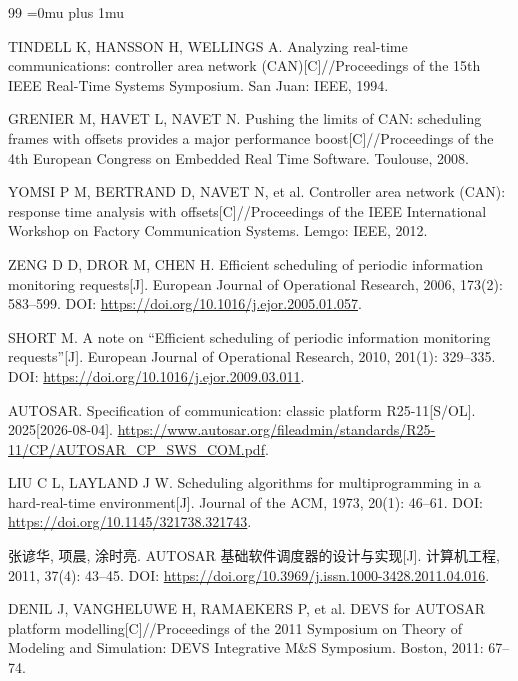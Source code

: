 \documentclass[UTF8,a4paper,twoside,zihao=-4]{ctexart}
\numberwithin{equation}{section}
\numberwithin{figure}{section}
\numberwithin{table}{section}
\theoremstyle{definition}
\numberwithin{algocf}{section}
\begin{document}
\clearpage
{}
{}
\begin{thebibliography}{99}
\songti\RaggedRight
\Urlmuskip=0mu plus 1mu\relax
\setlength{\itemsep}{0pt}
\setlength{\parsep}{0pt}

TINDELL K, HANSSON H, WELLINGS A. Analyzing real-time communications: controller area network (CAN)[C]//Proceedings of the 15th IEEE Real-Time Systems Symposium. San Juan: IEEE, 1994.

GRENIER M, HAVET L, NAVET N. Pushing the limits of CAN: scheduling frames with offsets provides a major performance boost[C]//Proceedings of the 4th European Congress on Embedded Real Time Software. Toulouse, 2008.

YOMSI P M, BERTRAND D, NAVET N, et al. Controller area network (CAN): response time analysis with offsets[C]//Proceedings of the IEEE International Workshop on Factory Communication Systems. Lemgo: IEEE, 2012.

ZENG D D, DROR M, CHEN H. Efficient scheduling of periodic information monitoring requests[J]. European Journal of Operational Research, 2006, 173(2): 583--599. DOI: \url{https://doi.org/10.1016/j.ejor.2005.01.057}.

SHORT M. A note on ``Efficient scheduling of periodic information monitoring requests''[J]. European Journal of Operational Research, 2010, 201(1): 329--335. DOI: \url{https://doi.org/10.1016/j.ejor.2009.03.011}.

AUTOSAR. Specification of communication: classic platform R25-11[S/OL]. 2025[2026-08-04]. \url{https://www.autosar.org/fileadmin/standards/R25-11/CP/AUTOSAR_CP_SWS_COM.pdf}.

LIU C L, LAYLAND J W. Scheduling algorithms for multiprogramming in a hard-real-time environment[J]. Journal of the ACM, 1973, 20(1): 46--61. DOI: \url{https://doi.org/10.1145/321738.321743}.

张谚华, 项晨, 涂时亮. AUTOSAR 基础软件调度器的设计与实现[J]. 计算机工程, 2011, 37(4): 43--45. DOI: \url{https://doi.org/10.3969/j.issn.1000-3428.2011.04.016}.

DENIL J, VANGHELUWE H, RAMAEKERS P, et al. DEVS for AUTOSAR platform modelling[C]//Proceedings of the 2011 Symposium on Theory of Modeling and Simulation: DEVS Integrative M\&S Symposium. Boston, 2011: 67--74.


\end{thebibliography}
\end{document}
